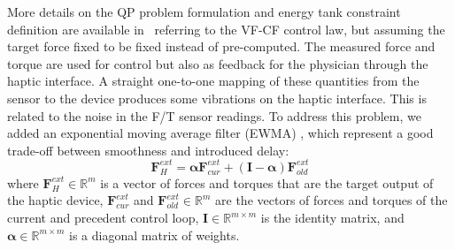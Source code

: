 More details on the QP problem formulation and energy tank constraint definition are available in~\cite{beber2023passive} referring to the VF-CF control law, but assuming the target force fixed to be fixed instead of pre-computed.
The measured force and torque are used for control but also as feedback for the physician through the haptic interface. A straight one-to-one mapping of these quantities from the sensor to the device produces some vibrations on the haptic interface. This is related to the noise in the F/T sensor readings. To address this problem, we added an exponential moving average filter (EWMA) \cite{roberts1959}, which represent a good trade-off between smoothness and introduced delay:
\begin{equation}
    \boldsymbol{F}^{ext}_H = \boldsymbol{\alpha} \boldsymbol{F}^{ext}_{cur} + (\boldsymbol{I} - \boldsymbol{\alpha}) \boldsymbol{F}^{ext}_{old} 
\end{equation}
where $\boldsymbol{F}^{ext}_H \in \mathbb{R}^{m}$ is a vector of forces and torques that are the target output of the haptic device, $\boldsymbol{F}^{ext}_{cur}$ and $\boldsymbol{F}^{ext}_{old} \in \mathbb{R}^{m}$ are the vectors of forces and torques of the current and precedent control loop, $\boldsymbol{I} \in \mathbb{R}^{m \times m}$ is the identity matrix, and $\boldsymbol{\alpha} \in \mathbb{R}^{m \times m}$ is a diagonal matrix of weights.
 


  
